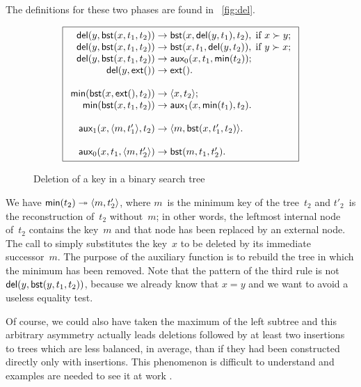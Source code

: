 The definitions for these two phases are found in \fig~\vref{fig:del}.
\begin{figure}
\begin{equation*}
\boxed{
\begin{array}{r@{\;}l@{\;}l}
  \fun{del}(y,\fun{bst}(x,t_1,t_2)) & \rightarrow &
  \fun{bst}(x,\fun{del}(y,t_1),t_2),\; \text{if \(x \succ y\)};\\
\fun{del}(y,\fun{bst}(x,t_1,t_2)) & \rightarrow &
  \fun{bst}(x,t_1,\fun{del}(y,t_2)),\; \text{if \(y \succ x\)};\\
\fun{del}(y,\fun{bst}(x,t_1,t_2)) & \rightarrow & 
   \fun{aux}_0(x,t_1,\fun{min}(t_2));\\
\fun{del}(y,\fun{ext}()) & \rightarrow & \fun{ext}().\\
\\
\fun{min}(\fun{bst}(x,\fun{ext}(),t_2)) & \rightarrow & \pair{x}{t_2};\\
\fun{min}(\fun{bst}(x,t_1,t_2)) & \rightarrow & 
  \fun{aux}_1(x,\fun{min}(t_1),t_2).\\
\\
\fun{aux}_1(x,\pair{m}{t'_1},t_2) & \rightarrow & 
  \pair{m}{\fun{bst}(x,t'_1,t_2)}.\\
\\
\fun{aux}_0(x,t_1,\pair{m}{t'_2}) & \rightarrow & \fun{bst}(m,t_1,t'_2).
\end{array}}
\end{equation*}
\caption{Deletion of a key in a binary search tree\label{fig:del}}
\end{figure}
We have \(\textsf{min}(t_2) \twoheadrightarrow
\langle{m},{t'_2}\rangle\), where \(m\)~is the minimum
key of the tree~\(t_2\) and \(t'_2\)~is the reconstruction of~\(t_2\)
without~\(m\); in other words, the leftmost internal node of~\(t_2\)
contains the key~\(m\) and that node has been replaced by an external
node. The call to  simply substitutes the key~\(x\)
to be deleted by its immediate successor~\(m\). The purpose of the
auxiliary function  is to rebuild the tree in which
the minimum has been removed. Note that the pattern of the third rule
is not \(\textsf{del}(y, \textsf{bst}(y,t_1,t_2))\),
because we already know that \(x=y\) and we want to avoid a useless
equality test.

Of course, we could also have taken the maximum of the left subtree
and this arbitrary asymmetry actually leads deletions followed by at
least two insertions to trees which are less balanced, in average,
than if they had been constructed directly only with insertions. This
phenomenon is difficult to understand and examples are needed to see
it at work
\citep{Eppinger_1983,CulbersonMunro_1989,CulbersonEvans_1994,Knuth_1998a,Heyer_2009}.

